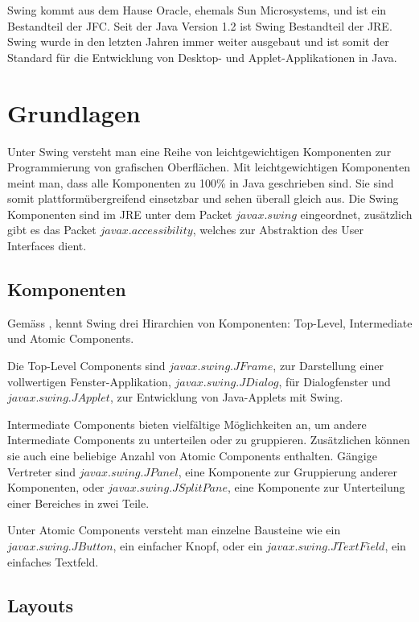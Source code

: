   Swing kommt aus dem Hause Oracle, ehemals Sun Microsystems, und ist ein
  Bestandteil der \ac{JFC}. Seit der Java Version 1.2 ist Swing Bestandteil der
  \ac{JRE}. Swing wurde in den letzten Jahren immer weiter ausgebaut und ist
  somit der Standard für die Entwicklung von Desktop- und Applet-Applikationen
  in Java.
  
  \section{Grundlagen}
  
  Unter Swing versteht man eine Reihe von leichtgewichtigen Komponenten zur
  Programmierung von grafischen Oberflächen. Mit leichtgewichtigen Komponenten
  meint man, dass alle Komponenten zu 100\% in Java geschrieben sind. Sie sind
  somit plattformübergreifend einsetzbar und sehen überall gleich aus. Die Swing
  Komponenten sind im \ac{JRE} unter dem Packet \(javax.swing\) eingeordnet,
  zusätzlich gibt es das Packet \(javax.accessibility\), welches zur
  Abstraktion des User Interfaces dient.
  
  \subsection{Komponenten}
  
  Gemäss \cite{SwingComponentsHighscore}, kennt Swing drei Hirarchien von
  Komponenten: Top-Level, Intermediate und Atomic Components.

  Die Top-Level Components sind \(javax.swing.JFrame\),
  zur Darstellung einer vollwertigen Fenster-Applikation,
  \(javax.swing.JDialog\), für Dialogfenster und \(javax.swing.JApplet\), zur
  Entwicklung von Java-Applets mit Swing.
  
  Intermediate Components bieten vielfältige Möglichkeiten an, um andere
  Intermediate Components zu unterteilen oder zu gruppieren. Zusätzlichen
  können sie auch eine beliebige Anzahl von Atomic Components enthalten. Gängige
  Vertreter sind \(javax.swing.JPanel\), eine Komponente zur Gruppierung anderer
  Komponenten, oder \(javax.swing.JSplitPane\), eine Komponente zur
  Unterteilung einer Bereiches in zwei Teile.
  
  Unter Atomic Components versteht man einzelne Bausteine wie ein
  \(javax.swing.JButton\), ein einfacher Knopf, oder ein
  \(javax.swing.JTextField\), ein einfaches Textfeld.  
  
  \subsection{Layouts}
  
